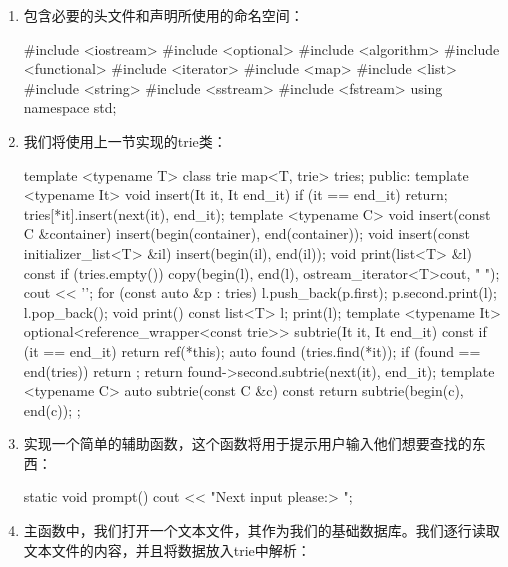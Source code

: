 \begin{enumerate}
\item 包含必要的头文件和声明所使用的命名空间：

\begin{codebox}[cpp]
#include <iostream>
#include <optional>
#include <algorithm>
#include <functional>
#include <iterator>
#include <map>
#include <list>
#include <string>
#include <sstream>
#include <fstream>
using namespace std;
\end{codebox}

\item 我们将使用上一节实现的trie类：

\begin{codebox}[cpp]
template <typename T>
class trie
{
    map<T, trie> tries;
public:
    template <typename It>
    void insert(It it, It end_it) {
        if (it == end_it) { return; }
        tries[*it].insert(next(it), end_it);
    }
    template <typename C>
    void insert(const C &container) {
        insert(begin(container), end(container));
    }
    void insert(const initializer_list<T> &il) {
        insert(begin(il), end(il));
    }
    void print(list<T> &l) const {
        if (tries.empty()) {
            copy(begin(l), end(l),
                ostream_iterator<T>{cout, " "});
            cout << '\n';
        }
        for (const auto &p : tries) {
            l.push_back(p.first);
            p.second.print(l);
            l.pop_back();
        }
    }
    void print() const {
        list<T> l;
        print(l);
    }
    template <typename It>
    optional<reference_wrapper<const trie>>
    subtrie(It it, It end_it) const {
        if (it == end_it) { return ref(*this); }
        auto found (tries.find(*it));
        if (found == end(tries)) { return {}; }
        return found->second.subtrie(next(it), end_it);
    }
    template <typename C>
    auto subtrie(const C &c) const {
        return subtrie(begin(c), end(c));
    }
};
\end{codebox}

\item 实现一个简单的辅助函数，这个函数将用于提示用户输入他们想要查找的东西：

\begin{codebox}[cpp]
static void prompt()
{
    cout << "Next input please:\n > ";
} 
\end{codebox}

\item 主函数中，我们打开一个文本文件，其作为我们的基础数据库。我们逐行读取文本文件的内容，并且将数据放入trie中解析：


\end{enumerate}
